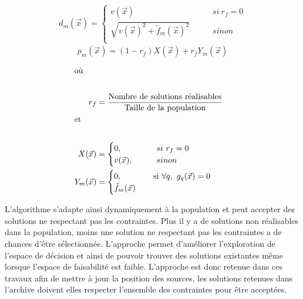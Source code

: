 \begin{align}\label{eq:dist_obj}
  d_{m}(\vec{x}) = \begin{cases}
                          v(\vec{x})                                     & \qquad si\  r_{f} = 0 \\
                          \sqrt{v(\vec{x})^2 + \tilde{f}_{m}(\vec{x})^2} & \qquad sinon          \\
                    \end{cases}
\end{align}
\begin{equation}\label{eq:penalty_norm}
  p_{m}(\vec{x}) = (1 - r_{f})  X(\vec{x}) + r_{f} Y_{m}(\vec{x})
\end{equation}

\begin{align*}
  \shortintertext{où} \\
    r_{f} &= \frac{\text{Nombre de solutions réalisables}}{\text{Taille de la population}} \\
  \shortintertext{et} \\
  X(\vec{x})     &= \begin{cases}
                0,          \qquad     & si\  r_{f} = 0\\
                v(\vec{x}), \qquad     & sinon\\
                \end{cases} \\
  Y_{m}(\vec{x}) &= \begin{cases}
                    0,          \quad \qquad & \text{si} \ \forall q, \ g_{q}(\vec{x}) = 0\\
                      \tilde{f}_{m}(\vec{x})  \\
            \end{cases}\\
\end{align*}

L’algorithme s’adapte ainsi dynamiquement à la population et peut accepter des
solutions ne respectant pas les contraintes. Plus il y a de solutions non
réalisables dans la population, moins une solution ne respectant pas les contraintes a
de chances d’être sélectionnée. L’approche permet d’améliorer l’exploration de
l’espace de décision et ainsi de pouvoir trouver des solutions existantes même
lorsque l’espace de faisabilité est faible.
L’approche est donc retenue dans ces travaux afin de mettre à jour la position des
sources, les solutions retenues dans l’archive doivent elles respecter
l’ensemble des contraintes pour être acceptées.


